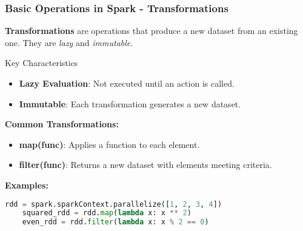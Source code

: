 \documentclass[aspectratio=169]{beamer}
\begin{document}
\begin{frame}[fragile]
    \frametitle{Basic Operations in Spark - Transformations}
    \textbf{Transformations} are operations that produce a new dataset from an existing one. They are \textit{lazy} and \textit{immutable}.

    \begin{block}{Key Characteristics}
        \begin{itemize}
            \item \textbf{Lazy Evaluation}: Not executed until an action is called.
            \item \textbf{Immutable}: Each transformation generates a new dataset.
        \end{itemize}
    \end{block}

    \textbf{Common Transformations:}
    \begin{itemize}
        \item \textbf{map(func)}: Applies a function to each element.
        \item \textbf{filter(func)}: Returns a new dataset with elements meeting criteria.
    \end{itemize}

    \textbf{Examples:}
    \begin{lstlisting}[language=Python]
    rdd = spark.sparkContext.parallelize([1, 2, 3, 4])
    squared_rdd = rdd.map(lambda x: x ** 2)
    even_rdd = rdd.filter(lambda x: x % 2 == 0)
    \end{lstlisting}
\end{frame}
\end{document}
